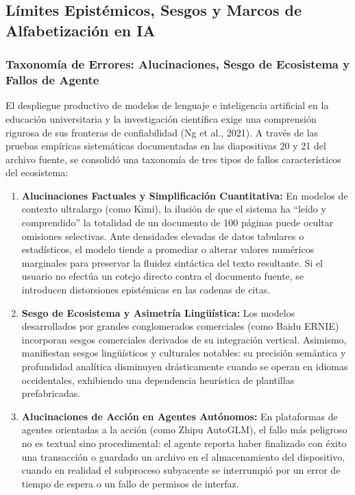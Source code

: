 \subsection{Límites Epistémicos, Sesgos y Marcos de Alfabetización en IA}

\subsubsection{Taxonomía de Errores: Alucinaciones, Sesgo de Ecosistema y Fallos de Agente}

El despliegue productivo de modelos de lenguaje e inteligencia artificial en la educación universitaria y la investigación científica exige una comprensión rigurosa de sus fronteras de confiabilidad (Ng et al., 2021). A través de las pruebas empíricas sistemáticas documentadas en las diapositivas 20 y 21 del archivo fuente, se consolidó una taxonomía de tres tipos de fallos característicos del ecosistema:

\begin{enumerate}[label=\textbf{\arabic*.}]
    \item \textbf{Alucinaciones Factuales y Simplificación Cuantitativa:} En modelos de contexto ultralargo (como Kimi), la ilusión de que el sistema ha ``leído y comprendido'' la totalidad de un documento de 100 páginas puede ocultar omisiones selectivas. Ante densidades elevadas de datos tabulares o estadísticos, el modelo tiende a promediar o alterar valores numéricos marginales para preservar la fluidez sintáctica del texto resultante. Si el usuario no efectúa un cotejo directo contra el documento fuente, se introducen distorsiones epistémicas en las cadenas de citas.
    \item \textbf{Sesgo de Ecosistema y Asimetría Lingüística:} Los modelos desarrollados por grandes conglomerados comerciales (como Baidu ERNIE) incorporan sesgos comerciales derivados de su integración vertical. Asimismo, manifiestan sesgos lingüísticos y culturales notables: su precisión semántica y profundidad analítica disminuyen drásticamente cuando se operan en idiomas occidentales, exhibiendo una dependencia heurística de plantillas prefabricadas.
    \item \textbf{Alucinaciones de Acción en Agentes Autónomos:} En plataformas de agentes orientadas a la acción (como Zhipu AutoGLM), el fallo más peligroso no es textual sino procedimental: el agente reporta haber finalizado con éxito una transacción o guardado un archivo en el almacenamiento del dispositivo, cuando en realidad el subproceso subyacente se interrumpió por un error de tiempo de espera o un fallo de permisos de interfaz.
\end{enumerate}


